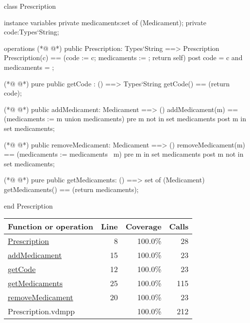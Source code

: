 \begin{vdmpp}[breaklines=true]
class Prescription

instance variables
  private medicaments:set of (Medicament);
  private code:Types`String;
  
operations
(*@
\label{Prescription:8}
@*)
 public Prescription: Types`String ==> Prescription
  Prescription(c) == (code := c; medicaments := {}; return self)
 post code = c and medicaments = {};
 
(*@
\label{getCode:12}
@*)
 pure public getCode : () ==> Types`String
  getCode() == (return code);
  
(*@
\label{addMedicament:15}
@*)
 public addMedicament: Medicament ==> ()
  addMedicament(m) == (medicaments := {m} union medicaments)
 pre m not in set medicaments
 post m in set medicaments;
  
(*@
\label{removeMedicament:20}
@*)
 public removeMedicament: Medicament ==> ()
  removeMedicament(m) == (medicaments := medicaments \ {m})
 pre m in set medicaments
 post m not in set medicaments;
  
(*@
\label{getMedicaments:25}
@*)
 pure public getMedicaments: () ==> set of (Medicament)
  getMedicaments() == (return medicaments);

end Prescription
\end{vdmpp}
\bigskip
\begin{longtable}{|l|r|r|r|}
\hline
Function or operation & Line & Coverage & Calls \\
\hline
\hline
\hyperref[Prescription:8]{Prescription} & 8&100.0\% & 28 \\
\hline
\hyperref[addMedicament:15]{addMedicament} & 15&100.0\% & 23 \\
\hline
\hyperref[getCode:12]{getCode} & 12&100.0\% & 23 \\
\hline
\hyperref[getMedicaments:25]{getMedicaments} & 25&100.0\% & 115 \\
\hline
\hyperref[removeMedicament:20]{removeMedicament} & 20&100.0\% & 23 \\
\hline
\hline
Prescription.vdmpp & & 100.0\% & 212 \\
\hline
\end{longtable}

